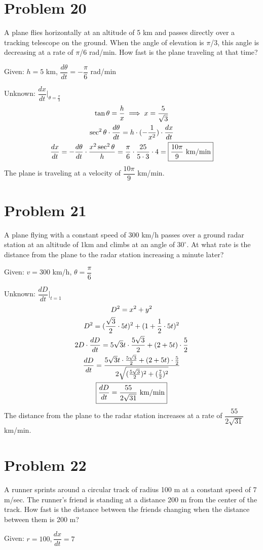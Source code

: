 \documentclass[12pt]{article}
\newcommand{\dxdt}{\dfrac{dx}{dt}}
\newcommand{\vem}{\vspace{0.5em}}
\newcommand{\problem}[1]{\section{Problem #1}}
\begin{document}
\problem{20}
A plane flies horizontally at an altitude of 5 km and passes directly over a tracking telescope on the
ground. When the angle of elevation is $\pi$/3, this angle is decreasing at a rate of $\pi$/6 rad/min. How fast
is the plane traveling at that time? \vem

Given: $h=5$ km, $\dfrac{d\theta}{dt}=-\dfrac{\pi}{6}$ rad/min\vem

Unknown: $\dxdt \Big|_{\theta = \frac{\pi}{3}}$
\begin{gather*}
    \tan \theta =\frac{h}{x} \implies x=\frac{5}{\sqrt{3}}\\
    \sec^2\theta \cdot \frac{d\theta}{dt}=h\cdot (-\frac{1}{x^2})\cdot \dxdt\\
    \dxdt=-\frac{d\theta}{dt}\cdot \frac{x^2\sec^2\theta }{h}=\frac{\pi}{6}\cdot \frac{25}{5\cdot3}\cdot 4=\boxed{\frac{10\pi}{9} $ km/min$}    
\end{gather*}
The plane is traveling at a velocity of $\dfrac{10\pi}{9}$ km/min.

\problem{21}
A plane flying with a constant speed of 300 km/h passes over a ground radar station at an altitude of
1km and climbs at an angle of $30^\circ$. At what rate is the distance from the plane to the radar station increasing a minute later? \vem

Given: $v=300$ km/h, $\theta = \dfrac{\pi}{6}$ \vem

Unknown: $\dfrac{dD}{dt} \Big|_{t=1}$
\begin{gather*}
    D^2=x^2+y^2\\
    D^2=(\frac{\sqrt{3}}{2}\cdot 5t)^2+(1+\frac{1}{2}\cdot 5t)^2\\
    2D\cdot \frac{dD}{dt}=5\sqrt{3}t\cdot \frac{5\sqrt{3}}{2}+(2+5t)\cdot \frac{5}{2}\\
    \frac{dD}{dt}=\frac{5\sqrt{3}t\cdot \frac{5\sqrt{3}}{2}+(2+5t)\cdot \frac{5}{2}}{2\sqrt{(\frac{5\sqrt{3}}{2})^2+(\frac{7}{2})^2}}\\
    \boxed{\frac{dD}{dt}=\frac{55}{2\sqrt{31}} $ km/min$}
\end{gather*}
The distance from the plane to the radar station increases at a rate of $\dfrac{55}{2\sqrt{31}}$ km/min.

\problem{22}
A runner sprints around a circular track of radius 100 m at a constant speed of 7 m/sec. The runner’s
friend is standing at a distance 200 m from the center of the track. How fast is the distance between the
friends changing when the distance between them is 200 m? \vem

Given: $r=100, \dxdt=7$ \vem
\end{document}
